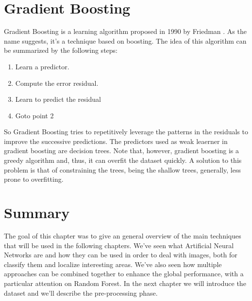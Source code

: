 \section{Gradient Boosting}
\label{sec:gradient_boosting}
Gradient Boosting is a learning algorithm proposed in 1990 by Friedman \cite{gradient_boosting}. As the name suggests, it's a technique based on boosting. The idea of this algorithm can be summarized by the following steps:
\begin{enumerate}
    \item Learn a predictor.
    \item Compute the error residual.
    \item Learn to predict the residual
    \item Goto point 2
\end{enumerate}

\noindent So Gradient Boosting tries to repetitively leverage the patterns in the residuals to improve the successive predictions.
The predictors used as weak leaerner in gradient boosting are decision trees. Note that, however, gradient boosting is a greedy algorithm and, thus, it can overfit the dataset quickly. A solution to this problem is that of constraining the trees, being the shallow trees, generally, less prone to overfitting.


\section{Summary}
\label{sec:sec_chapter_sumary}
The goal of this chapter was to give an general overview of the main techniques that will be used in the following chapters. We've seen what Artificial Neural Networks are and how they can be used in order to deal with images, both for classify them and localize interesting areas. We've also seen how multiple approaches can be combined together to enhance the global performance, with a particular attention on Random Forest. In the next chapter we will introduce the dataset and we'll describe the pre-processing phase.
